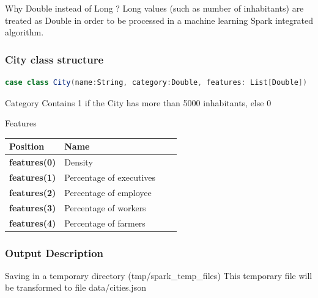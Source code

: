 \documentclass[slidetop,9pt,utf8]{beamer}
\begin{document}
\begin{CJK}{UTF8}{gbsn}
\begin{frame}
  \begin{block}{Why Double instead of Long ?}
    Long values (such as number of inhabitants) are treated as Double in order to be processed in a machine learning Spark integrated algorithm.
  \end{block}

\end{frame}

\begin{frame}[fragile]

  \frametitle{City class structure}

  \begin{lstlisting}[label=CityClassOverview, caption=psug.hands.on.exercise05.City class overview, language=scala, style=code]
case class City(name:String, category:Double, features: List[Double])
  \end{lstlisting}

  \begin{block}{Category}
    Contains 1 if the City has more than 5000 inhabitants, else 0
  \end{block}

  \begin{block}{Features}
    \begin{center}
      \begin{tabular}{|l|l|l|l|}
            \hline 
            \rowcolor{gray} \textbf{Position} & \textbf{Name} \\ \hline
            \textbf{features(0)} & Density \\ \hline
            \textbf{features(1)} & Percentage of executives \\ \hline
            \textbf{features(2)} & Percentage of employee \\ \hline
            \textbf{features(3)} & Percentage of workers \\ \hline
            \textbf{features(4)} & Percentage of farmers \\ \hline
      \end{tabular}
    \end{center}
  \end{block}

\end{frame}

\begin{frame}[fragile]

  \frametitle{Output Description}
  
  \begin{block}{Saving in a temporary directory (tmp/spark\_temp\_files)}
    This temporary file will be transformed to file data/cities.json
  \end{block}



\end{frame}
\end{CJK}
\end{document}
